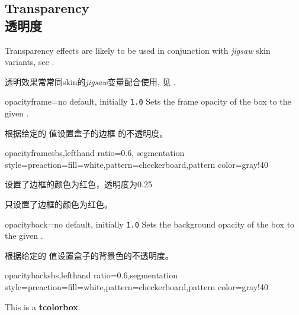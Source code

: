 \setcounter{section}{4}
\setcounter{subsection}{8}
\setcounter{subsubsection}{0}
 
\subsection{Transparency\\透明度}

\begin{marker}
Transparency effects are likely to be used in conjunction with \emph{jigsaw}
skin variants, see .

透明效果常常同skin的\emph{jigsaw}变量配合使用, 见 .
\end{marker}

\begin{docTcbKey}{opacityframe}{=}{no default, initially \texttt{1.0}}
Sets the frame opacity of the box to the given .

根据给定的  值设置盒子的边框%
的不透明度。
\begin{exdispExample*}{opacityframe}{sbs,lefthand ratio=0.6,
segmentation style={preaction={fill=white},pattern=checkerboard,pattern color=gray!40}
}
\begin{tcolorbox}[opacityframe=0.25
,title=设置了边框的颜色和透明度,
colframe=red]
设置了边框的颜色为红色，透明度为0.25
\end{tcolorbox}
\begin{tcolorbox}[colframe=red
,title=设置了边框的颜色]
只设置了边框的颜色为红色。
\end{tcolorbox}
\end{exdispExample*}
\end{docTcbKey}


\begin{docTcbKey}{opacityback}{=}{no default, initially \texttt{1.0}}
Sets the background opacity of the box to the given .

根据给定的  值设置盒子的背景色的不透明度。
\begin{exdispExample*}{opacityback}{sbs,lefthand ratio=0.6,segmentation style={preaction={fill=white},pattern=checkerboard,pattern color=gray!40}}
\begin{tcolorbox}[standard jigsaw,colframe=red,
opacityframe=0.5, opacityback=0.5]
This is a \textbf{tcolorbox}.
\end{tcolorbox}
\end{exdispExample*}
\end{docTcbKey}

